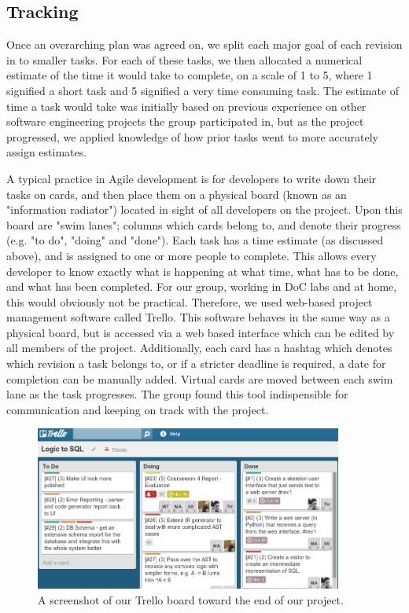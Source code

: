 \documentclass[a4paper, 11pt]{article}
\begin{document}
  \subsection{Tracking}
    Once an overarching plan was agreed on, we split each major goal of each
    revision in to smaller tasks. For each of these tasks, we then allocated a
    numerical estimate of the time it would take to complete, on a scale of 1
    to 5, where 1 signified a short task and 5 signified a very time consuming
    task. The estimate of time a task would take was initially based on
    previous experience on other software engineering projects the group
    participated in, but as the project progressed, we applied knowledge of how
    prior tasks went to more accurately assign estimates.

    A typical practice in Agile development is for developers to write down
    their tasks on cards, and then place them on a physical board (known as an
    "information radiator") located in sight of all developers on the project.
    Upon this board are "swim lanes"; columns which cards belong to, and denote
    their progress (e.g. "to do", "doing" and "done"). Each task has a time
    estimate (as discussed above), and is assigned to one or more people to
    complete.  This allows every developer to know exactly what is happening at
    what time, what has to be done, and what has been completed. For our group,
    working in DoC labs and at home, this would obviously not be practical.
    Therefore, we used web-based project management software called
    Trello. This software behaves in the same way as a physical board, but is
    accessed via a web based interface which can be edited by all members of
    the project.  Additionally, each card has a hashtag which denotes which
    revision a task belongs to, or if a stricter deadline is required, a date
    for completion can be manually added.  Virtual cards are moved between each
    swim lane as the task progresses. The group found this tool indispensible
    for communication and keeping on track with the project.


    \begin{figure}[h!]
      \centering
      \includegraphics[width=0.9\textwidth]{images/trello.png}
      \caption{A screenshot of our Trello board toward the end of our project.}
    \end{figure}
\end{document}
